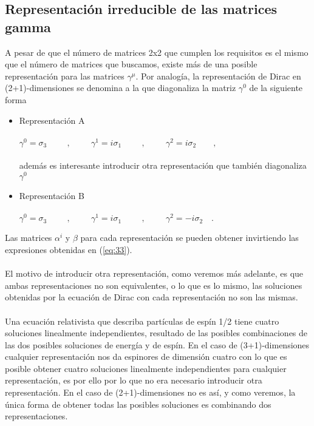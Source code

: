 \documentclass[11pt,letterpaper]{article}     %
\begin{document}
\subsection{Representación irreducible de las matrices gamma}






A pesar de que el número de matrices 2x2 que cumplen los requisitos es el mismo que el número de matrices que buscamos, existe más de una posible representación para las matrices $\gamma^\mu$. Por analogía, la representación de Dirac en (2+1)-dimensiones se denomina a la que diagonaliza la matriz $\gamma^0$ de la siguiente forma
\begin{itemize}
\item Representación A \\ \\
$\gamma^0=\sigma_3 \hspace{1cm} , \hspace{1cm} \gamma^1=i\sigma_1 \hspace{1cm}, \hspace{1cm} \gamma^2=i\sigma_2 \qquad,$ \\ \\
además es interesante introducir otra representación que también diagonaliza $\gamma^0$ \\ 
\item Representación B \\ \\
$\gamma^0=\sigma_3 \hspace{1cm}, \hspace{1cm} \gamma^1=i\sigma_1 \hspace{1cm}, \hspace{1cm} \gamma^2=-i\sigma_2 \quad .$
\end{itemize}
Las matrices $\alpha^i$ y $\beta$ para cada representación se pueden obtener invirtiendo las expresiones obtenidas en (\ref{eq:33}). \\ \\
El motivo de introducir otra representación, como veremos más adelante, es que ambas representaciones no son equivalentes, o lo que es lo mismo, las soluciones obtenidas por la ecuación de Dirac con cada representación no son las mismas.\\ \\
Una ecuación relativista que describa partículas de espín 1/2 tiene cuatro soluciones linealmente independientes, resultado de las posibles combinaciones de las dos posibles soluciones de energía y de espín. En el caso de (3+1)-dimensiones cualquier representación nos da espinores de dimensión cuatro con lo que es posible obtener cuatro soluciones linealmente independientes para cualquier representación, es por ello por lo que no era necesario introducir otra representación. En el caso de (2+1)-dimensiones no es así, y como veremos, la única forma de obtener todas las posibles soluciones es combinando dos representaciones. \\ \\
\end{document}
